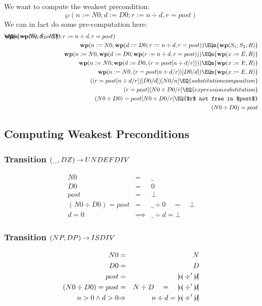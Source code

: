 We want to compute the weakest precondition:
$$
  \wp(n := N0 ; d := D0 ; r := n \div d ,r = post)
$$
We can in fact do some pre-computation here:
\begin{eqnarray*}
\lefteqn{\wp(n := N0 ; d := D0 ; r := n \div d ,r=post)}
\EQm{\wp(S_1;S_2,R)}
\\&& \wp(n := N0,\wp(d := D0 ; r := n \div d ,r=post))
\EQm{\wp(S_1;S_2,R)}
\\&& \wp(n := N0,\wp(d := D0,\wp(r := n \div d ,r=post)))
\EQm{\wp(x:=E,R)}
\\&& \wp(n := N0,\wp(d := D0,(r=post[n \div d/r])))
\EQm{\wp(x:=E,R)}
\\&& \wp(n := N0,(r=post[n \div d/r])[D0/d])
\EQm{\wp(x:=E,R)}
\\&& ((r=post[n \div d/r])[D0/d])[N0/n]
\EQ{substitution composition}
\\&& (r=post)[N0 \div D0/r]
\EQ{expression substitution}
\\&& (N0 \div D0)=post[N0 \div D0/r]
\EQ{$r$ not free in $post$}
\\&& (N0 \div D0)=post
\end{eqnarray*}



\subsection{Computing Weakest Preconditions}

\subsubsection{Transition $(\_,DZ) \mathbin{\rightarrow} UNDEFDIV$}

\begin{eqnarray*}
   N0 &=& \_
\\ D0 &=& 0
\\ post &=& \bot
\\ (N0 \div D0)=post
   &=&
   \_ \div 0\quad=\quad\bot
\\  d = 0 &\implies& \_ \div d = \bot
\end{eqnarray*}


\subsubsection{Transition $(NP,DP) \mathbin{\rightarrow} ISDIV$}

\begin{eqnarray*}
   N0 &=& N
\\ D0 &=& D
\\ post &=& \abs n \div' \abs d
\\ (N0 \div D0)=post 
   &=&
   N \div D \quad=\quad \abs n \div' \abs d
\\  n>0 \land  d>0 &\implies& n \div d = \abs n \div' \abs d
\end{eqnarray*}


